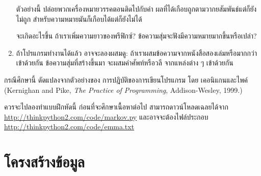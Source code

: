 \begin{exercise}
\begin{enumerate}
ตัวอย่างนี้ ปล่อยพวกเครื่องหมายวรรคตอนติดไปกับคำ
ผลที่ได้เกือบถูกตามวากยสัมพันธ์แต่ก็ยังไม่ถูก
สำหรับความหมายมันก็เกือบได้แต่ก็ยังไม่ได้


จะเกิดอะไรขึ้น ถ้าเราเพิ่มความยาวของพรีฟิกซ์?
ข้อความสุ่มจะฟังมีความหมายมากขึ้นหรือเปล่า?


\item ถ้าโปรแกรมทำงานได้แล้ว อาจจะลองผสมดู:
ถ้าเราผสมข้อความจากหนังสือสองเล่มหรือมากกว่าเข้าด้วยกัน
ข้อความสุ่มที่สร้างขึ้นมา จะผสมคำศัพท์หรือวลี จากแหล่งต่าง ๆ เข้าด้วยกัน

\end{enumerate}


กรณีศึกษานี้ ดัดแปลงจากตัวอย่างของ
การปฎิบัติของการเขียนโปรแกรม โดย เคอนิแกนและไพค์
(Kernighan and
Pike, \textit{The Practice of Programming}, Addison-Wesley, 1999.)

\end{exercise}


ควรจะไปลองทำแบบฝึกหัดนี้ ก่อนที่จะศึกษาเนื้อหาต่อไป
สามารถดาวน์โหลดเฉลยได้จาก \url{http://thinkpython2.com/code/markov.py}
และอาจจะต้องไฟล์ประกอบ \url{http://thinkpython2.com/code/emma.txt}

\section{โครงสร้างข้อมูล}


